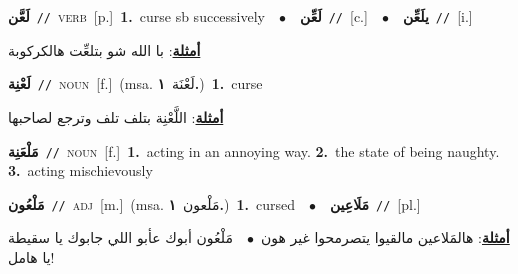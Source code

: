\documentclass[10pt,a4paper,twoside]{article} %
\begin{document}
\begin{multicols}{2}
{\setlength\topsep{0pt}\textbf{\foreignlanguage{arabic}{لَعَّن}}\ {\color{gray}\texttt{//}\color{black}}\ \textsc{verb}\ [p.]\ \textbf{1.}~curse sb successively\ \ $\bullet$\ \ \setlength\topsep{0pt}\textbf{\foreignlanguage{arabic}{لَعِّن}}\ {\color{gray}\texttt{//}\color{black}}\ [c.]\ \ $\bullet$\ \ \setlength\topsep{0pt}\textbf{\foreignlanguage{arabic}{يلَعِّن}}\ {\color{gray}\texttt{//}\color{black}}\ [i.]\  \begin{flushright}\color{gray}\foreignlanguage{arabic}{\textbf{\underline{\foreignlanguage{arabic}{أمثلة}}}: با الله شو بتلعِّت هالكركوبة}\end{flushright}\color{black}} \vspace{2mm}

{\setlength\topsep{0pt}\textbf{\foreignlanguage{arabic}{لَعْنِة}}\ {\color{gray}\texttt{//}\color{black}}\ \textsc{noun}\ [f.]\ \color{gray}(msa. \foreignlanguage{arabic}{لَعْنَة}~\foreignlanguage{arabic}{\textbf{١.}})\color{black}\ \textbf{1.}~curse\  \begin{flushright}\color{gray}\foreignlanguage{arabic}{\textbf{\underline{\foreignlanguage{arabic}{أمثلة}}}: اللَّعْنِة بتلف تلف وترجع لصاحبها}\end{flushright}\color{black}} \vspace{2mm}

{\setlength\topsep{0pt}\textbf{\foreignlanguage{arabic}{مَلْعَنِة}}\ {\color{gray}\texttt{//}\color{black}}\ \textsc{noun}\ [f.]\ \textbf{1.}~acting in an annoying way.  \textbf{2.}~the state of being naughty.  \textbf{3.}~acting mischievously\ } \vspace{2mm}

{\setlength\topsep{0pt}\textbf{\foreignlanguage{arabic}{مَلْعُون}}\ {\color{gray}\texttt{//}\color{black}}\ \textsc{adj}\ [m.]\ \color{gray}(msa. \foreignlanguage{arabic}{مَلْعون}~\foreignlanguage{arabic}{\textbf{١.}})\color{black}\ \textbf{1.}~cursed\ \ $\bullet$\ \ \setlength\topsep{0pt}\textbf{\foreignlanguage{arabic}{مَلَاعِين}}\ {\color{gray}\texttt{//}\color{black}}\ [pl.]\  \begin{flushright}\color{gray}\foreignlanguage{arabic}{\textbf{\underline{\foreignlanguage{arabic}{أمثلة}}}: هالمَلاعين مالقيوا يتصرمحوا غير هون\ $\bullet$\ \  مَلْعُون أبوك عأبو اللي جابوك يا سقيطة يا هامل!}\end{flushright}\color{black}} \vspace{2mm}


\end{multicols}
\end{document}
